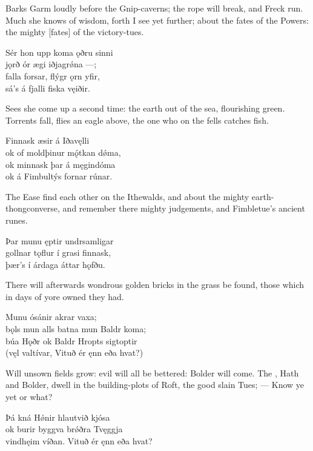 \bvb Barks Garm loudly before the Gnip-caverns; the rope will break, and Freck run. Much she knows of wisdom, forth I see yet further; about the fates of the Powers: the mighty [fates] of the victory-tues.\evb

\bva Sér hon upp koma \hld ǫðru sinni \\%
jǫrð ór ægi \hld iðjagrǿna —; \\%
falla forsar, \hld flýgr ǫrn yfir, \\%
sá’s á fjalli \hld fiska vęiðir.\eva

\bvb Sees she come up a second time: the earth out of the sea, flourishing green. Torrents fall, flies an eagle above, the one who on the fells catches fish.\evb

\bva Finnask æsir \hld á Iðavęlli \\%
ok of moldþinur \hld mǫ́tkan dǿma, \\%
ok minnask þar \hld á męgindóma \\%
ok á Fimbultýs \hld fornar rúnar.\eva

\bvb The Ease find each other on the Ithewalds, and about the mighty earth-thong\footnotemark[1] converse, and remember there mighty judgements, and Fimbletue’s ancient runes.\evb
{}

\bva Þar munu ęptir \hld undrsamligar \\%
gollnar tǫflur \hld í grasi finnask, \\%
þær’s í árdaga \hld áttar hǫfðu.\eva

\bvb There will afterwards wondrous golden bricks in the grass be found, those which in days of yore owned they had.\evb

\bva Munu ósánir \hld akrar vaxa; \\%
bǫls mun alls batna \hld mun Baldr koma; \\%
búa Hǫðr ok Baldr \hld Hropts sigtoptir \\%
(vęl valtívar, \hld Vituð ér ęnn eða hvat?)\eva

\bvb Will unsown fields grow: evil will all be bettered: Bolder will come. The , Hath and Bolder, dwell in the building-plots of Roft, the good slain Tues\footnotemark[1]; — Know ye yet or what?\evb
{}

\bva Þá kná Hǿnir \hld hlautvið kjósa \\%
ok burir byggva \hld brǿðra Tvęggja \\%
vindhęim víðan. \hld Vituð ér ęnn eða hvat?\eva

